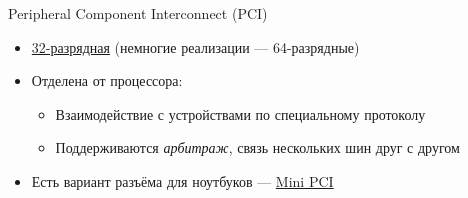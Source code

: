 \documentclass[xetex,aspectratio=43]{beamer}
\begin{document}
\begin{frame}{Peripheral Component Interconnect (PCI)}
    \begin{itemize}
        \item \href{https://en.wikipedia.org/wiki/Peripheral_Component_Interconnect}{32-разрядная} (немногие реализации --- 64-разрядные)
        \item \alert<2->{Отделена от процессора:}
        \begin{itemize}
            \item Взаимодействие с устройствами по специальному протоколу
            \item Поддерживаются \emph{арбитраж}, связь нескольких шин друг с другом
        \end{itemize}
    \pause
    \item Есть вариант разъёма для ноутбуков --- \href{https://en.wikipedia.org/wiki/Peripheral\_Component\_Interconnect\#Mini_PCI}{Mini PCI}
    \end{itemize}
\end{frame}
\end{document}
